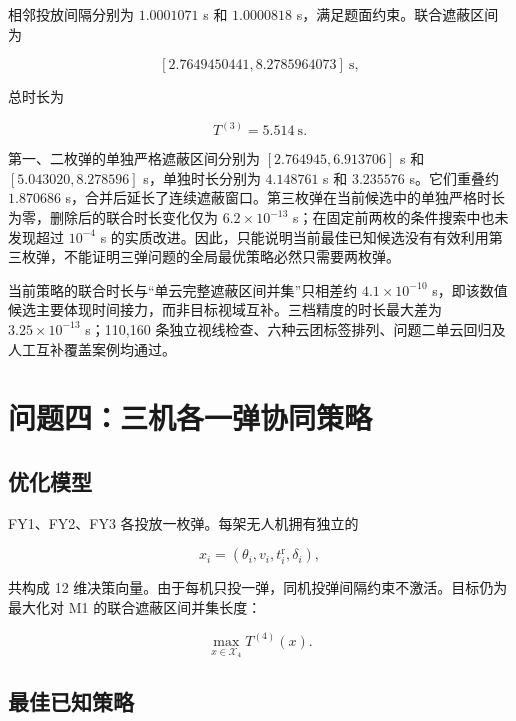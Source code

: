 相邻投放间隔分别为 $1.0001071$ s 和 $1.0000818$ s，满足题面约束。联合遮蔽区间为

\[
[2.7649450441,8.2785964073]\ \mathrm s,
\]

总时长为

\[
\boxed{T^{(3)}=5.514\ \mathrm s}.
\]

第一、二枚弹的单独严格遮蔽区间分别为 $[2.764945,\allowbreak{}6.913706]$ s 和 $[5.043020,\allowbreak{}8.278596]$ s，单独时长分别为 $4.148761$ s 和 $3.235576$ s。它们重叠约 $1.870686$ s，合并后延长了连续遮蔽窗口。第三枚弹在当前候选中的单独严格时长为零，删除后的联合时长变化仅为 $6.2\times10^{-13}$ s；在固定前两枚的条件搜索中也未发现超过 $10^{-4}$ s 的实质改进。因此，只能说明当前最佳已知候选没有有效利用第三枚弹，不能证明三弹问题的全局最优策略必然只需要两枚弹。

当前策略的联合时长与“单云完整遮蔽区间并集”只相差约 $4.1\times10^{-10}$ s，即该数值候选主要体现时间接力，而非目标视域互补。三档精度的时长最大差为 $3.25\times10^{-13}$ s；110,160 条独立视线检查、六种云团标签排列、问题二单云回归及人工互补覆盖案例均通过。

\section{问题四：三机各一弹协同策略}

\subsection{优化模型}

FY1、FY2、FY3 各投放一枚弹。每架无人机拥有独立的

\[
x_i=(\theta_i,v_i,t_i^{\mathrm r},\delta_i),
\]

共构成 12 维决策向量。由于每机只投一弹，同机投弹间隔约束不激活。目标仍为最大化对 M1 的联合遮蔽区间并集长度：

\[
\max_{x\in\mathcal X_4}T^{(4)}(x).
\]

\subsection{最佳已知策略}

